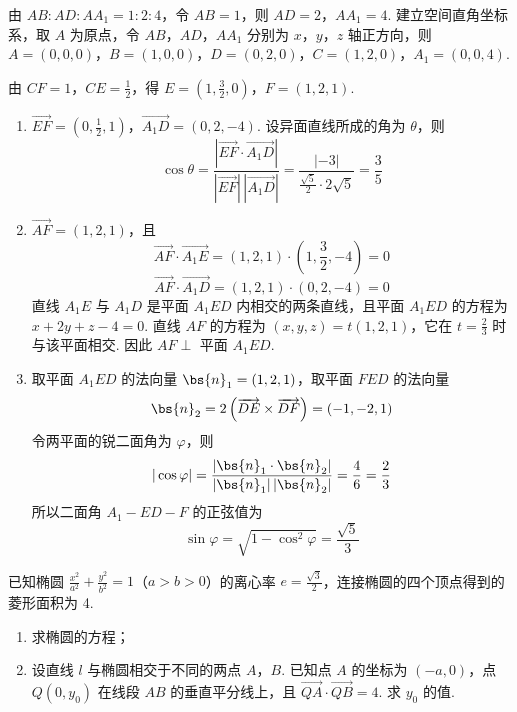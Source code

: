 \begin{solution}
由 \(AB:AD:AA_1=1:2:4\)，令 \(AB=1\)，则 \(AD=2\)，\(AA_1=4\). 建立空间直角坐标系，取 \(A\) 为原点，令 \(AB\)，\(AD\)，\(AA_1\) 分别为 \(x\)，\(y\)，\(z\) 轴正方向，则 \(A=(0,0,0)\)，\(B=(1,0,0)\)，\(D=(0,2,0)\)，\(C=(1,2,0)\)，\(A_1=(0,0,4)\).

由 \(CF=1\)，\(CE=\frac{1}{2}\)，得 \(E=\left(1,\frac{3}{2},0\right)\)，\(F=(1,2,1)\).

\begin{enumerate}
\item \(\overrightarrow{EF}=\left(0,\frac{1}{2},1\right)\)，\(\overrightarrow{A_1D}=(0,2,-4)\). 设异面直线所成的角为 \(\theta\)，则
\[
\cos\theta=\frac{\left|\overrightarrow{EF}\cdot\overrightarrow{A_1D}\right|}{|\overrightarrow{EF}|\,|\overrightarrow{A_1D}|}=\frac{|-3|}{\frac{\sqrt{5}}{2}\cdot2\sqrt{5}}=\frac{3}{5}
\]
\item \(\overrightarrow{AF}=(1,2,1)\)，且
\[
\overrightarrow{AF}\cdot\overrightarrow{A_1E}=(1,2,1)\cdot\left(1,\frac{3}{2},-4\right)=0
\]
\[
\overrightarrow{AF}\cdot\overrightarrow{A_1D}=(1,2,1)\cdot(0,2,-4)=0
\]
直线 \(A_1E\) 与 \(A_1D\) 是平面 \(A_1ED\) 内相交的两条直线，且平面 \(A_1ED\) 的方程为 \(x+2y+z-4=0\). 直线 \(AF\) 的方程为 \((x,y,z)=t(1,2,1)\)，它在 \(t=\frac{2}{3}\) 时与该平面相交. 因此 \(AF\perp\) 平面 \(A_1ED\).
\item 取平面 \(A_1ED\) 的法向量 \(\bs{n}_1=(1,2,1)\)，取平面 \(FED\) 的法向量
\[
\bs{n}_2=2\left(\overrightarrow{DE}\times\overrightarrow{DF}\right)=(-1,-2,1)
\]
令两平面的锐二面角为 \(\varphi\)，则
\[
|\cos\varphi|=\frac{|\bs{n}_1\cdot\bs{n}_2|}{|\bs{n}_1|\,|\bs{n}_2|}=\frac{4}{6}=\frac{2}{3}
\]
所以二面角 \(A_1-ED-F\) 的正弦值为
\[
\sin\varphi=\sqrt{1-\cos^2\varphi}=\frac{\sqrt{5}}{3}
\]
\end{enumerate}
\end{solution}

\begin{problem}
已知椭圆 \(\frac{x^2}{a^2} + \frac{y^2}{b^2} = 1 \)（\(a > b > 0\)）的离心率 \(e = \frac{\sqrt{3}}{2}\)，连接椭圆的四个顶点得到的菱形面积为 4.
\begin{enumerate}
\item 求椭圆的方程；
\item 设直线 \(l\) 与椭圆相交于不同的两点 \(A\)，\(B\). 已知点 \(A\) 的坐标为 \((-a, 0)\)，点 \(Q(0, y_{0})\) 在线段 \(AB\) 的垂直平分线上，且 \(\overrightarrow{QA} \cdot \overrightarrow{QB} = 4\). 求 \(y_{0}\) 的值.
\end{enumerate}
\end{problem}

